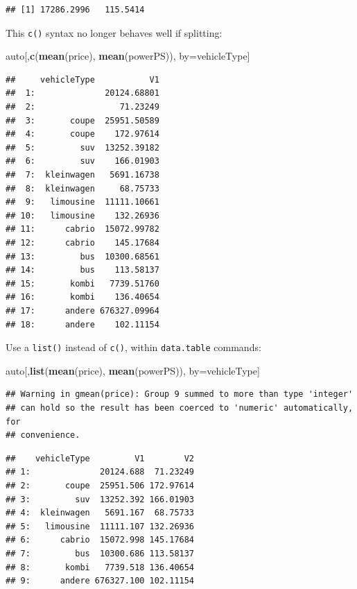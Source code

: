 \documentclass[]{book}
\newenvironment{Shaded}{\begin{snugshade}}{\end{snugshade}}
\newcommand{\KeywordTok}[1]{\textcolor[rgb]{0.13,0.29,0.53}{\textbf{#1}}}
\newcommand{\NormalTok}[1]{#1}
\theoremstyle{definition}
\theoremstyle{definition}
\theoremstyle{definition}
\theoremstyle{remark}
\begin{document}
\begin{verbatim}
## [1] 17286.2996   115.5414
\end{verbatim}

This \texttt{c()} syntax no longer behaves well if splitting:

\begin{Shaded}
\begin{Highlighting}[]
\NormalTok{auto[,}\KeywordTok{c}\NormalTok{(}\KeywordTok{mean}\NormalTok{(price), }\KeywordTok{mean}\NormalTok{(powerPS)), by=vehicleType]}
\end{Highlighting}
\end{Shaded}

\begin{verbatim}
##     vehicleType           V1
##  1:              20124.68801
##  2:                 71.23249
##  3:       coupe  25951.50589
##  4:       coupe    172.97614
##  5:         suv  13252.39182
##  6:         suv    166.01903
##  7:  kleinwagen   5691.16738
##  8:  kleinwagen     68.75733
##  9:   limousine  11111.10661
## 10:   limousine    132.26936
## 11:      cabrio  15072.99782
## 12:      cabrio    145.17684
## 13:         bus  10300.68561
## 14:         bus    113.58137
## 15:       kombi   7739.51760
## 16:       kombi    136.40654
## 17:      andere 676327.09964
## 18:      andere    102.11154
\end{verbatim}

Use a \texttt{list()} instead of \texttt{c()}, within
\texttt{data.table} commands:

\begin{Shaded}
\begin{Highlighting}[]
\NormalTok{auto[,}\KeywordTok{list}\NormalTok{(}\KeywordTok{mean}\NormalTok{(price), }\KeywordTok{mean}\NormalTok{(powerPS)), by=vehicleType]}
\end{Highlighting}
\end{Shaded}

\begin{verbatim}
## Warning in gmean(price): Group 9 summed to more than type 'integer'
## can hold so the result has been coerced to 'numeric' automatically, for
## convenience.
\end{verbatim}

\begin{verbatim}
##    vehicleType         V1        V2
## 1:              20124.688  71.23249
## 2:       coupe  25951.506 172.97614
## 3:         suv  13252.392 166.01903
## 4:  kleinwagen   5691.167  68.75733
## 5:   limousine  11111.107 132.26936
## 6:      cabrio  15072.998 145.17684
## 7:         bus  10300.686 113.58137
## 8:       kombi   7739.518 136.40654
## 9:      andere 676327.100 102.11154
\end{verbatim}
\end{document}
